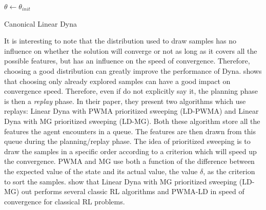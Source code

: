 \documentclass[]{article}
\begin{document}
\begin{algorithm}[htbp]
  \DontPrintSemicolon
  \SetAlgoNoLine
  \(\theta \gets \theta_{init}\)\;
  \caption{Canonical Linear Dyna \label{alg:canonical_dyna}}
\end{algorithm}


It is interesting to note that the distribution used to draw samples has no influence on whether the solution will converge or not as long as it covers all the possible features, but has an influence on the speed of convergence. Therefore, choosing a good distribution can greatly improve the performance of Dyna. \textcite{sutton_dyna-style_2012} shows that choosing only already explored samples can have a good impact on convergence speed. Therefore, even if \textcite{sutton_dyna-style_2012} do not explicitly say it, the planning phase is then a \emph{replay} phase. In their paper, they present two algorithms which use replays: Linear  Dyna  with  PWMA  prioritized sweeping (LD-PWMA) and Linear Dyna with MG prioritized sweeping (LD-MG). Both these algorithm store all the features the agent encounters in a queue. The features are then drawn from this queue during the planning/replay phase. The idea of prioritized sweeping is to draw the samples in a specific order according to a criterion which will speed up the convergence. PWMA and MG use both a function of the difference between the expected value of the state and its actual value, the value \(\delta\), as the criterion to sort the samples. \textcite{sutton_dyna-style_2012} show that Linear Dyna with MG prioritized sweeping (LD-MG) out performs several classic RL algorithms and PWMA-LD in speed of convergence for classical RL problems.
\end{document}
